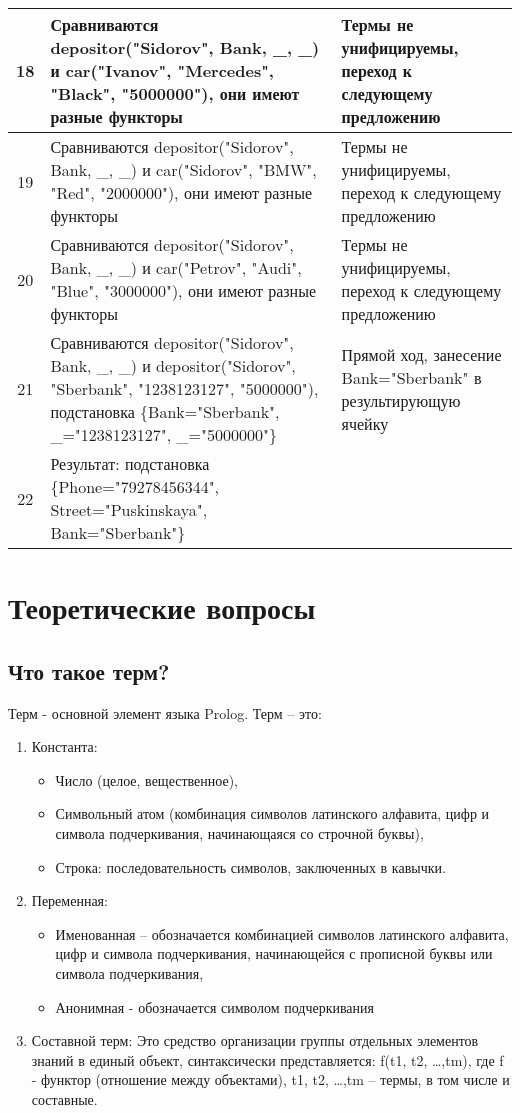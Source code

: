 \documentclass[a4paper,12pt]{article}
\begin{document}
\newpage
\begin{table}[ht!] 
	\begin{tabularx}{\linewidth}{|c|>{\centering}X|>{\centering}X|}
		\hline
		18 & Сравниваются depositor("Sidorov"{}, Bank, \_, \_) и car("Ivanov"{}, "Mercedes"{}, "Black"{}, "5000000"), они имеют разные функторы & Термы не унифицируемы, переход к следующему предложению \tabularnewline
		\hline
		19 & Сравниваются depositor("Sidorov"{}, Bank, \_, \_) и car("Sidorov"{}, "BMW"{}, "Red"{}, "2000000"), они имеют разные функторы & Термы не унифицируемы, переход к следующему предложению \tabularnewline
		\hline
		20 & Сравниваются depositor("Sidorov"{}, Bank, \_, \_) и car("Petrov"{}, "Audi"{}, "Blue"{}, "3000000"), они имеют разные функторы & Термы не унифицируемы, переход к следующему предложению \tabularnewline
		\hline
		21 & Сравниваются depositor("Sidorov"{}, Bank, \_, \_) и depositor("Sidorov"{}, "Sberbank"{}, "1238123127"{}, "5000000"), подстановка \{Bank="Sberbank"{}, \_="1238123127"{}, \_="5000000"\}& Прямой ход, занесение Bank="Sberbank" в результирующую ячейку\tabularnewline
		\hline
		22 & Результат: подстановка \{Phone="79278456344"{}, Street="Puskinskaya"{}, Bank="Sberbank"\} & \tabularnewline
		\hline
	\end{tabularx}
\end{table}	

\section*{Теоретические вопросы}

\subsection*{Что такое терм?}
Терм - основной элемент языка Prolog. Терм – это:
\begin{enumerate}
	\item Константа: 
	\begin{itemize}
		\item Число (целое, вещественное),
		\item Символьный атом (комбинация символов латинского алфавита, цифр и символа подчеркивания, начинающаяся со строчной буквы),
		\item Строка: последовательность символов, заключенных в кавычки.
	\end{itemize}
	\item Переменная:
	\begin{itemize}
		\item Именованная – обозначается комбинацией символов латинского алфавита, цифр и символа подчеркивания, начинающейся с прописной буквы или символа подчеркивания,
		\item Анонимная  - обозначается символом подчеркивания
	\end{itemize}
	\item Составной терм:
	Это средство организации группы отдельных элементов знаний в единый  объект,  синтаксически представляется: f(t1, t2, …,tm), где f -  функтор (отношение между объектами), t1, t2, …,tm – термы, в том  числе  и составные.
\end{enumerate}
\end{document}
